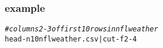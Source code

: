 \documentclass[12pt]{beamer}\usepackage[]{graphicx}\usepackage[]{color}
\makeatletter
\newcommand{\hlcom}[1]{\textcolor[rgb]{0.678,0.584,0.686}{\textit{#1}}}%
\newenvironment{kframe}{%
 \def\at@end@of@kframe{}%
 \ifinner\ifhmode%
  \def\at@end@of@kframe{\end{minipage}}%
  \begin{minipage}{\columnwidth}%
 \fi\fi%
 \def\FrameCommand##1{\hskip\@totalleftmargin \hskip-\fboxsep
 \colorbox{shadecolor}{##1}\hskip-\fboxsep
     \hskip-\linewidth \hskip-\@totalleftmargin \hskip\columnwidth}%
 \MakeFramed {\advance\hsize-\width
   \@totalleftmargin\z@ \linewidth\hsize
   \@setminipage}}%
 {\par\unskip\endMakeFramed%
 \at@end@of@kframe}
\newenvironment{knitrout}{}{} %
\makeatother
\begin{document}

\begin{frame}[fragile]
\frametitle{ example}

\begin{knitrout}\scriptsize
{}\color{fgcolor}\begin{kframe}
\begin{alltt}
\hlcom{# columns 2-3 of first 10 rows in nflweather}
head -n 10 nflweather.csv | cut -f 2-4 
\end{alltt}
\end{kframe}
\end{knitrout}

\end{frame}

\end{document}
